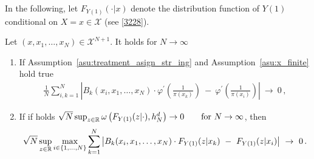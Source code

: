 In the following,
let $F_{Y(1)}(\cdot|x)$ denote the distribution function of $Y(1)$ conditional on $X=x\in\mathcal{X}$ (see \eqref{3228}).
\begin{lemma}
  \label{lem:basis_2}
  Let $(x,x_1,\ldots,x_N)\in\mathcal{X}^{N+1}$.
  It holds
  for $N\to\infty$
  \begin{enumerate}[label=(\roman*)]
      \item
        If Assumption~\ref{asu:treatment_asign_str_ing} and Assumption~\ref{asu:x_finite} hold true
      \begin{align*}
        \frac
        {1}
        {N}
        \sum_{i,k=1}^{N}
            \left|
        B_k(x_i,x_1,\ldots,x_N)
        \cdot
        \varphi^{'}
            \left(
              \frac
              {1}
              {\pi(x_k)}
            \right)
            \ 
            -
            \ 
            \varphi^{'}
            \left(
              \frac
              {1}
              {\pi(x_i)}
            \right)
            \right|
            \ 
            \to
            \ 
            0
            \,,
          \end{align*}
\item
  If if holds
  $
  \sqrt{N}
  \sup_{z\in\R}
  \omega
  \left( 
    F_{Y(1)}(z|\cdot)
    ,h_N^d
  \right)
  \to
  0
  \qquad
  \text{for}\ 
  N\to \infty
  $, then
      \begin{align*}
        \sqrt{N}
        \sup_{z\in\R}
        \max_{i\in \left\{ 1,\ldots,N \right\}}
        \sum_{k=1}^{N}
            \left|
        B_k(x_i,x_1,\ldots,x_N)
        \cdot
        F_{Y(1)}(z|x_k)
            \ 
            -
            \ 
        F_{Y(1)}(z|x_i)
            \right|
            \ 
            \to
            \ 
            0
            \,.
      \end{align*}
\end{enumerate}
\end{lemma}
